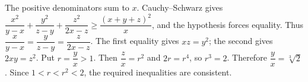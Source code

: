 The positive denominators sum to $x$. Cauchy--Schwarz gives $\dfrac{x^2}{y-x}+\dfrac{y^2}{z-y}+\dfrac{z^2}{2x-z}\ge\dfrac{(x+y+z)^2}{x}$, and the hypothesis forces equality. Thus $\dfrac{x}{y-x}=\dfrac{y}{z-y}=\dfrac{z}{2x-z}$. The first equality gives $xz=y^2$; the second gives $2xy=z^2$. Put $r=\dfrac{y}{x}>1$. Then $\dfrac{z}{x}=r^2$ and $2r=r^4$, so $r^3=2$. Therefore $\boxed{\dfrac{y}{x}=\sqrt[3]{2}}$. Since $1<r<r^2<2$, the required inequalities are consistent.
